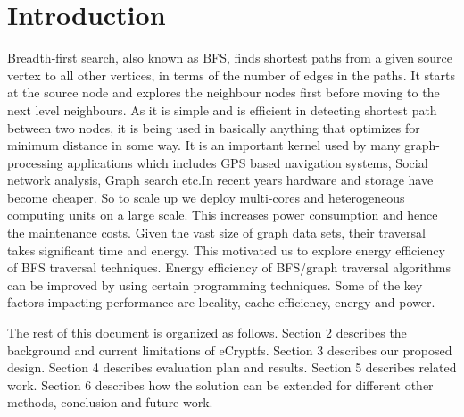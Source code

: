 \section{Introduction}
\label{intro}

Breadth-first search, also known as BFS, finds shortest paths from a given
source vertex to all other vertices, in terms of the number of edges in the
paths. It starts at the source node and explores the neighbour nodes first
before moving to the next level neighbours. As it is simple and is efficient in
detecting shortest path between two nodes, it is being used in basically
anything that optimizes for minimum distance in some way. It is an important
kernel used by many graph-processing applications which includes GPS based
navigation systems, Social network analysis, Graph search etc.\newline In
recent years hardware and storage have become cheaper. So to scale up we deploy
multi-cores and heterogeneous computing units on a large scale. This increases
power consumption and hence the maintenance costs. Given the vast size of graph
data sets, their traversal takes significant time and energy. This motivated us
to explore energy efficiency of BFS traversal techniques.  Energy efficiency of
BFS/graph traversal algorithms can be improved by using certain programming
techniques. Some of the key factors impacting performance are locality, cache
efficiency, energy and power.




%
%

The rest of this document is organized as follows.  Section 2
describes the background and current limitations of eCryptfs.  Section
3 describes our proposed design.  Section 4 describes evaluation plan
and results.  Section 5 describes related work.  Section 6 describes
how the solution can be extended for different other methods,
conclusion and future work.


